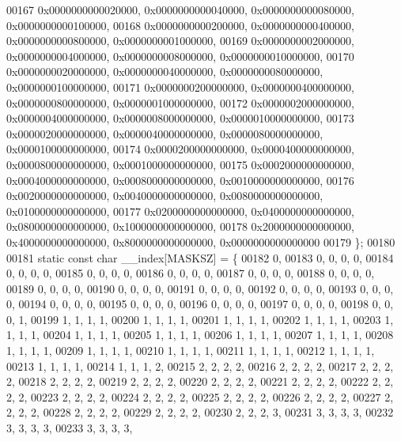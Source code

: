 \begin{DoxyCode}
00167         0x0000000000020000, 0x0000000000040000, 0x0000000000080000, 0x0000000000100000,
00168         0x0000000000200000, 0x0000000000400000, 0x0000000000800000, 0x0000000001000000,
00169         0x0000000002000000, 0x0000000004000000, 0x0000000008000000, 0x0000000010000000,
00170         0x0000000020000000, 0x0000000040000000, 0x0000000080000000, 0x0000000100000000,
00171         0x0000000200000000, 0x0000000400000000, 0x0000000800000000, 0x0000001000000000,
00172         0x0000002000000000, 0x0000004000000000, 0x0000008000000000, 0x0000010000000000,
00173         0x0000020000000000, 0x0000040000000000, 0x0000080000000000, 0x0000100000000000,
00174         0x0000200000000000, 0x0000400000000000, 0x0000800000000000, 0x0001000000000000,
00175         0x0002000000000000, 0x0004000000000000, 0x0008000000000000, 0x0010000000000000,
00176         0x0020000000000000, 0x0040000000000000, 0x0080000000000000, 0x0100000000000000,
00177         0x0200000000000000, 0x0400000000000000, 0x0800000000000000, 0x1000000000000000,
00178         0x2000000000000000, 0x4000000000000000, 0x8000000000000000, 0x0000000000000000
00179 \};
00180 
00181 \textcolor{keyword}{static} \textcolor{keyword}{const} \textcolor{keywordtype}{char} \_\_index[MASKSZ] = \{
00182         0,
00183         0, 0, 0, 0,
00184         0, 0, 0, 0,
00185         0, 0, 0, 0,
00186         0, 0, 0, 0,
00187         0, 0, 0, 0,
00188         0, 0, 0, 0,
00189         0, 0, 0, 0,
00190         0, 0, 0, 0,
00191         0, 0, 0, 0,
00192         0, 0, 0, 0,
00193         0, 0, 0, 0,
00194         0, 0, 0, 0,
00195         0, 0, 0, 0,
00196         0, 0, 0, 0,
00197         0, 0, 0, 0,
00198         0, 0, 0, 1,
00199         1, 1, 1, 1,
00200         1, 1, 1, 1,
00201         1, 1, 1, 1,
00202         1, 1, 1, 1,
00203         1, 1, 1, 1,
00204         1, 1, 1, 1,
00205         1, 1, 1, 1,
00206         1, 1, 1, 1,
00207         1, 1, 1, 1,
00208         1, 1, 1, 1,
00209         1, 1, 1, 1,
00210         1, 1, 1, 1,
00211         1, 1, 1, 1,
00212         1, 1, 1, 1,
00213         1, 1, 1, 1,
00214         1, 1, 1, 2,
00215         2, 2, 2, 2,
00216         2, 2, 2, 2,
00217         2, 2, 2, 2,
00218         2, 2, 2, 2,
00219         2, 2, 2, 2,
00220         2, 2, 2, 2,
00221         2, 2, 2, 2,
00222         2, 2, 2, 2,
00223         2, 2, 2, 2,
00224         2, 2, 2, 2,
00225         2, 2, 2, 2,
00226         2, 2, 2, 2,
00227         2, 2, 2, 2,
00228         2, 2, 2, 2,
00229         2, 2, 2, 2,
00230         2, 2, 2, 3,
00231         3, 3, 3, 3,
00232         3, 3, 3, 3,
00233         3, 3, 3, 3,

\end{DoxyCode}
